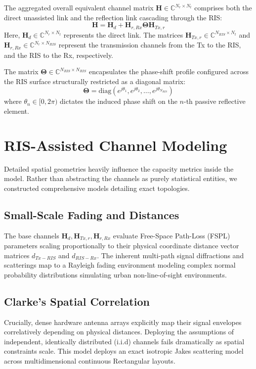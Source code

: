\documentclass[conference]{IEEEtran}
\begin{document}
The aggregated overall equivalent channel matrix $\mathbf{H} \in \mathbb{C}^{N_r \times N_t}$ comprises both the direct unassisted link and the reflection link cascading through the RIS:
\begin{equation}
\mathbf{H} = \mathbf{H}_d + \mathbf{H}_{r,Rx} \boldsymbol{\Theta} \mathbf{H}_{Tx,r}
\end{equation}
Here, $\mathbf{H}_d \in \mathbb{C}^{N_r \times N_t}$ represents the direct link. The matrices $\mathbf{H}_{Tx,r} \in \mathbb{C}^{N_{RIS} \times N_t}$ and $\mathbf{H}_{r,Rx} \in \mathbb{C}^{N_r \times N_{RIS}}$ represent the transmission channels from the Tx to the RIS, and the RIS to the Rx, respectively.

The matrix $\boldsymbol{\Theta} \in \mathbb{C}^{N_{RIS} \times N_{RIS}}$ encapsulates the phase-shift profile configured across the RIS surface structurally restricted as a diagonal matrix:
\begin{equation}
\boldsymbol{\Theta} = \text{diag}\left(e^{j\theta_1}, e^{j\theta_2}, \dots, e^{j\theta_{N_{RIS}}}\right)
\end{equation}
where $\theta_n \in [0, 2\pi)$ dictates the induced phase shift on the $n$-th passive reflective element. 

\section{RIS-Assisted Channel Modeling}

Detailed spatial geometries heavily influence the capacity metrics inside the model. Rather than abstracting the channels as purely statistical entities, we constructed comprehensive models detailing exact topologies.

\subsection{Small-Scale Fading and Distances}
The base channels $\mathbf{H}_d, \mathbf{H}_{Tx,r}, \mathbf{H}_{r,Rx}$ evaluate Free-Space Path-Loss (FSPL) parameters scaling proportionally to their physical coordinate distance vector matrices $d_{Tx-RIS}$ and $d_{RIS-Rx}$. The inherent multi-path signal diffractions and scatterings map to a Rayleigh fading environment modeling complex normal probability distributions simulating urban non-line-of-sight environments.

\subsection{Clarke's Spatial Correlation}
Crucially, dense hardware antenna arrays explicitly map their signal envelopes correlatively depending on physical distances. Deploying the assumptions of independent, identically distributed (i.i.d) channels fails dramatically as spatial constraints scale. This model deploys an exact isotropic Jakes scattering model across multidimensional continuous Rectangular layouts.
\end{document}
